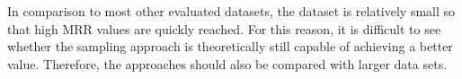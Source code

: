 In comparison to most other evaluated datasets, the \umls dataset is relatively small so that high MRR values are quickly reached.
For this reason, it is difficult to see whether the sampling approach is theoretically still capable of achieving a better value.
Therefore, the approaches should also be compared with larger data sets.


